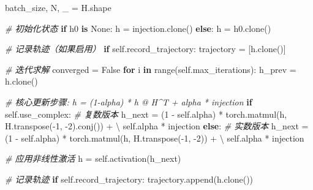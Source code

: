\documentclass[
  12pt,
]{article}
\newenvironment{Shaded}{}{}
\newcommand{\BuiltInTok}[1]{#1}
\newcommand{\CommentTok}[1]{\textcolor[rgb]{0.38,0.63,0.69}{\textit{#1}}}
\newcommand{\ControlFlowTok}[1]{\textcolor[rgb]{0.00,0.44,0.13}{\textbf{#1}}}
\newcommand{\DecValTok}[1]{\textcolor[rgb]{0.25,0.63,0.44}{#1}}
\newcommand{\KeywordTok}[1]{\textcolor[rgb]{0.00,0.44,0.13}{\textbf{#1}}}
\newcommand{\NormalTok}[1]{#1}
\newcommand{\OperatorTok}[1]{\textcolor[rgb]{0.40,0.40,0.40}{#1}}
\newcommand{\VariableTok}[1]{\textcolor[rgb]{0.10,0.09,0.49}{#1}}
\begin{document}
\begin{Shaded}
\begin{Highlighting}[]
\NormalTok{        batch\_size, N, \_ }\OperatorTok{=}\NormalTok{ H.shape}
        
        \CommentTok{\# 初始化状态}
        \ControlFlowTok{if}\NormalTok{ h0 }\KeywordTok{is} \VariableTok{None}\NormalTok{:}
\NormalTok{            h }\OperatorTok{=}\NormalTok{ injection.clone()}
        \ControlFlowTok{else}\NormalTok{:}
\NormalTok{            h }\OperatorTok{=}\NormalTok{ h0.clone()}
        
        \CommentTok{\# 记录轨迹（如果启用）}
        \ControlFlowTok{if} \VariableTok{self}\NormalTok{.record\_trajectory:}
\NormalTok{            trajectory }\OperatorTok{=}\NormalTok{ [h.clone()]}
        
        \CommentTok{\# 迭代求解}
\NormalTok{        converged }\OperatorTok{=} \VariableTok{False}
        \ControlFlowTok{for}\NormalTok{ i }\KeywordTok{in} \BuiltInTok{range}\NormalTok{(}\VariableTok{self}\NormalTok{.max\_iterations):}
\NormalTok{            h\_prev }\OperatorTok{=}\NormalTok{ h.clone()}
            
            \CommentTok{\# 核心更新步骤: h = (1{-}alpha) * h @ H\^{}T + alpha * injection}
            \ControlFlowTok{if} \VariableTok{self}\NormalTok{.use\_complex:}
                \CommentTok{\# 复数版本}
\NormalTok{                h\_next }\OperatorTok{=}\NormalTok{ (}\DecValTok{1} \OperatorTok{{-}} \VariableTok{self}\NormalTok{.alpha) }\OperatorTok{*}\NormalTok{ torch.matmul(h, H.transpose(}\OperatorTok{{-}}\DecValTok{1}\NormalTok{, }\OperatorTok{{-}}\DecValTok{2}\NormalTok{).conj()) }\OperatorTok{+} \OperatorTok{\textbackslash{}}
                         \VariableTok{self}\NormalTok{.alpha }\OperatorTok{*}\NormalTok{ injection}
            \ControlFlowTok{else}\NormalTok{:}
                \CommentTok{\# 实数版本}
\NormalTok{                h\_next }\OperatorTok{=}\NormalTok{ (}\DecValTok{1} \OperatorTok{{-}} \VariableTok{self}\NormalTok{.alpha) }\OperatorTok{*}\NormalTok{ torch.matmul(h, H.transpose(}\OperatorTok{{-}}\DecValTok{1}\NormalTok{, }\OperatorTok{{-}}\DecValTok{2}\NormalTok{)) }\OperatorTok{+} \OperatorTok{\textbackslash{}}
                         \VariableTok{self}\NormalTok{.alpha }\OperatorTok{*}\NormalTok{ injection}
            
            \CommentTok{\# 应用非线性激活}
\NormalTok{            h }\OperatorTok{=} \VariableTok{self}\NormalTok{.activation(h\_next)}
            
            \CommentTok{\# 记录轨迹}
            \ControlFlowTok{if} \VariableTok{self}\NormalTok{.record\_trajectory:}
\NormalTok{                trajectory.append(h.clone())}
            

\end{Highlighting}
\end{Shaded}
\end{document}
